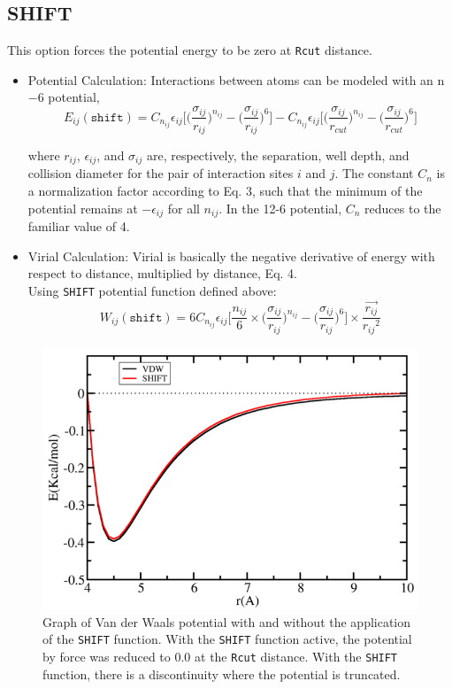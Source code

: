 \subsection{SHIFT} This option forces the potential energy to be zero at \texttt{Rcut} distance.
\begin{itemize}
	\item Potential Calculation: Interactions between atoms can be modeled with an n$-$6 potential,
	\begin{equation}
E_{ij}(\texttt{shift}) = C_{n_{ij}} \epsilon_{ij} \bigg[\bigg(\frac{\sigma_{ij}}{r_{ij}}\bigg)^{n_{ij}} - \bigg(\frac{\sigma_{ij}}{r_{ij}}\bigg)^6\bigg] - C_{n_{ij}} \epsilon_{ij} \bigg[\bigg(\frac{\sigma_{ij}}{r_{cut}}\bigg)^{n_{ij}} - \bigg(\frac{\sigma_{ij}}{r_{cut}}\bigg)^6\bigg]
\end{equation}

where $r_{ij}$, $\epsilon_{ij}$, and $\sigma_{ij}$ are, respectively, the separation, well depth, and collision diameter for the pair of interaction sites $i$ and $j$. The constant $C_n$ is a normalization factor according to Eq. 3, such that the minimum of the potential remains at $-\epsilon_{ij}$ for all $n_{ij}$. In the 12-6 potential, $C_n$ reduces to the familiar value of 4.
	\item Virial Calculation: Virial is basically the negative derivative of energy with respect to distance, multiplied by distance, Eq. 4.\\
Using \texttt{SHIFT} potential function defined above:
\begin{equation}
W_{ij}(\texttt{shift}) = 6C_{n_{ij}} \epsilon_{ij} \bigg[\frac{n_{ij}}{6} \times \bigg(\frac{\sigma_{ij}}{r_{ij}}\bigg)^{n_{ij}} - \bigg(\frac{\sigma_{ij}}{r_{ij}}\bigg)^6\bigg]\times \frac{\overrightarrow{r_{ij}}}{{r_{ij}}^2}
\end{equation}
\end{itemize}
\begin{figure}[H]
\centering
\includegraphics[scale=1.0]{images/VDW_SHIFT}
\caption{Graph of Van der Waals potential with and without the application of the \texttt{SHIFT} function. With the \texttt{SHIFT} function active, the potential by force was reduced to 0.0 at the \texttt{Rcut} distance. With the \texttt{SHIFT} function, there is a discontinuity where the potential is truncated.}
\end{figure}

